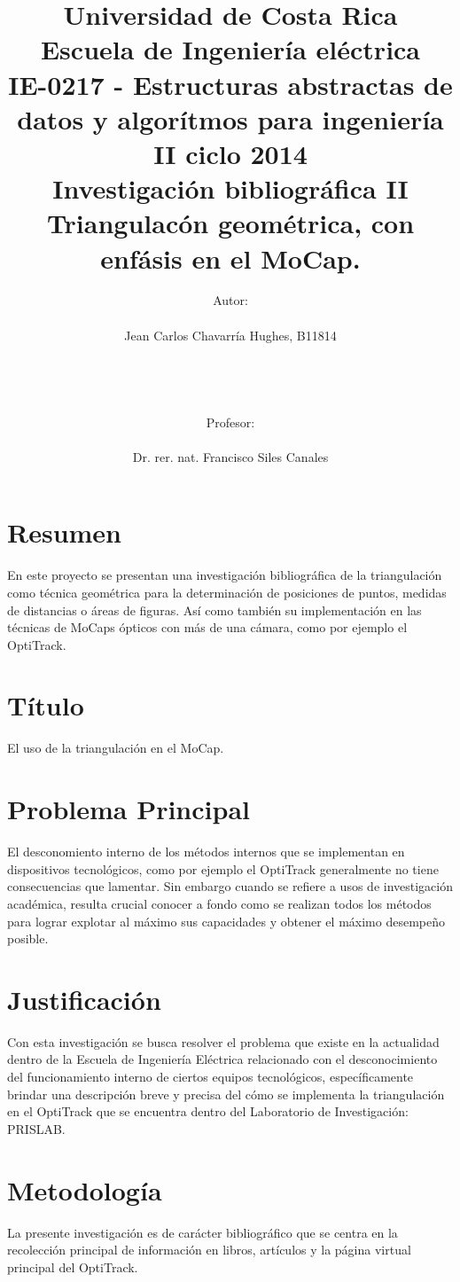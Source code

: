 \documentclass[11pt,letterpaper]{article}     %
\author{Autor: \\ \\Jean Carlos Chavarría Hughes, B11814\\ \\ \\ \\ \\Profesor:\\ \\Dr. rer. nat. Francisco Siles Canales \vspace*{2.0in}}
\title{Universidad de Costa Rica\\{\small Escuela de Ingeniería eléctrica\\ IE-0217 - Estructuras abstractas de datos y algor\' itmos para ingeniería\\II ciclo 2014\\\vspace*{0.55in} Investigación bibliográfica II}\\ Triangulac\' on geom\' etrica, con enf\' asis en el MoCap.
\vspace*{1.35in}}
\begin{document}

\maketitle
\newpage
\tableofcontents
\newpage
\listoffigures
\newpage

\section{Resumen}
En este proyecto se presentan una investigaci\' on bibliogr\' afica de la triangulaci\' on como t\' ecnica geom\' etrica para la determinaci\' on de posiciones de puntos, medidas de distancias o \' areas de figuras. As\' i como tambi\' en su implementaci\' on en las t\' ecnicas de MoCaps \' opticos con m\' as de una c\' amara, como por ejemplo el OptiTrack.

\section{T\' itulo}
El uso de la triangulaci\' on en el MoCap.

\section{Problema Principal}
El desconomiento interno de los m\' etodos internos que se implementan en dispositivos tecnol\' ogicos, como por ejemplo el OptiTrack generalmente no tiene consecuencias que lamentar. Sin embargo cuando se refiere a usos de investigaci\' on acad\' emica, resulta crucial conocer a fondo como se realizan todos los m\' etodos para lograr explotar al m\' aximo sus capacidades y obtener el m\' aximo desempe\~ no posible.

\section{Justificación}
Con esta investigaci\' on se busca resolver el problema que existe en la actualidad dentro de la Escuela de Ingenier\' ia El\' ectrica relacionado con el desconocimiento del funcionamiento interno de ciertos equipos tecnol\' ogicos, espec\' ificamente brindar una descripci\' on breve y precisa del c\' omo se implementa la triangulaci\' on en el OptiTrack que se encuentra dentro del Laboratorio de Investigaci\' on: PRISLAB.

\section{Metodolog\' ia}
La presente investigaci\' on es de car\' acter bibliogr\' afico que se centra en la recolecci\' on principal de informaci\' on en libros, art\' iculos y la p\' agina virtual principal del OptiTrack.
\end{document}
